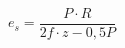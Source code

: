 \documentclass[12pt]{article}
\begin{document}
\begin{displaymath}
e_s = \frac {P \cdot R} {2f \cdot z - 0,5P}
\end{displaymath}
\end{document}
